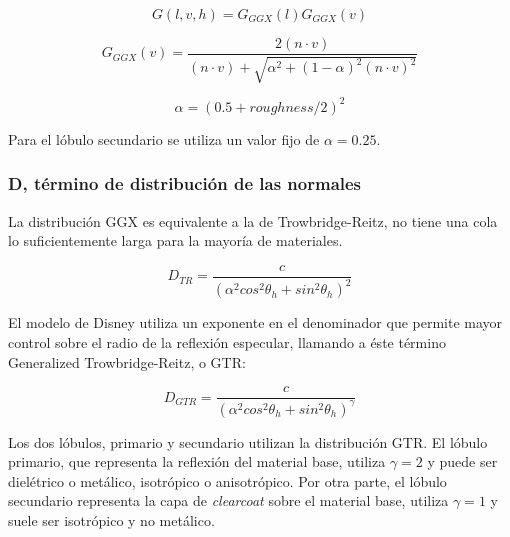                 $$
                G(l, v, h) = G_{GGX}(l)G_{GGX}(v)
                $$
    
                $$
                G_{GGX}(v) = \frac
                {2 (n \cdot{v})}
                {(n \cdot{v}) + \sqrt{ \alpha^2 + (1 - \alpha)^2 (n \cdot{v})^2 }}
                $$
    
                \begin{equation}
                \alpha = (0.5 + roughness / 2)^2
                \end{equation}
                \singlespacing
    
                Para el l\'obulo secundario se utiliza un valor fijo de $\alpha = 0.25$.
    
            \subsubsection{D, t\'ermino de distribuci\'on de las normales}
                La distribuci\'on GGX es equivalente a la de Trowbridge-Reitz, no tiene una cola lo suficientemente larga para la
                mayor\'ia de materiales.
    
                \begin{equation}
                    D_{TR} = \frac
                    {c}
                    {(\alpha^2 cos^2 \theta_h + sin^2 \theta_h)^2}
                \end{equation}
                \singlespacing
    
                El modelo de Disney utiliza un exponente en el denominador que permite mayor control sobre el radio de la reflexi\'on
                especular, llamando a \'este t\'ermino Generalized Trowbridge-Reitz, o GTR:
    
                \begin{equation}
                    D_{GTR} = \frac
                    {c}
                    {(\alpha^2 cos^2 \theta_h + sin^2 \theta_h)^\gamma}
                \end{equation}
                \singlespacing
    
                Los dos l\'obulos, primario y secundario utilizan la distribuci\'on GTR. El l\'obulo primario,
                que representa la reflexi\'on del material base, utiliza $\gamma = 2$ y puede ser diel\'etrico o met\'alico,
                isotr\'opico o anisotr\'opico. Por otra parte, el l\'obulo secundario representa la capa de \textit{clearcoat}
                sobre el material base, utiliza $\gamma = 1$ y suele ser isotr\'opico y no met\'alico.
    
